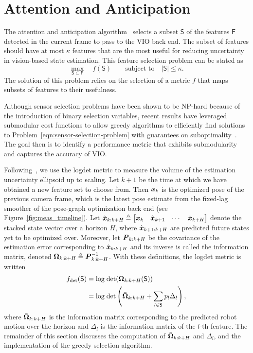 
\section{Attention and Anticipation}\label{sec:anticipation}

The attention and anticipation algorithm~\cite{Carlone2017} selects a subset $\mathsf{S}$ of the features $\mathsf{F}$ detected in the current frame to pass to the VIO back end.
The subset of features should have at most $\kappa$ features that are the most useful for reducing uncertainty in vision-based state estimation.
This feature selection problem can be stated as
\begin{equation}\label{eqn:sensor-selection-problem}
\max_{\mathsf{S}\subset\mathsf{F}} \quad f(\mathsf{S}) \qquad \text{subject to}\quad |\mathsf{S}|\le\kappa.
\end{equation}
The solution of this problem relies on the selection of a metric $f$ that maps subsets of features to their usefulness.

Although sensor selection problems have been shown to be NP-hard because of the introduction of binary selection variables, recent results have leveraged submodular cost functions to allow greedy algorithms to efficiently find solutions to Problem~\eqref{eqn:sensor-selection-problem} with guarantees on suboptimality~\cite{Shamaiah2010}.
The goal then is to identify a performance metric that exhibits submodularity and captures the accuracy of VIO.

Following~\cite{Carlone2017}, we use the logdet metric to measure the volume of the estimation uncertainty ellipsoid up to scaling.
Let $k+1$ be the time at which we have obtained a new feature set to choose from.
Then $\boldsymbol x_k$ is the optimized pose of the previous camera frame, which is the latest pose estimate from the fixed-lag smoother of the pose-graph optimization back end (see Figure~\ref{fig:meas_timeline}).
Let $\hat{\boldsymbol x}_{k:k+H}\triangleq\begin{bmatrix}\boldsymbol x_k&\hat{\boldsymbol x}_{k+1}&\cdots&\hat{\boldsymbol x}_{k+H}\end{bmatrix}$ denote the stacked state vector over a horizon $H$, where $\hat{\boldsymbol x}_{k+1:k+H}$ are predicted future states yet to be optimized over.
Moreover, let ${\boldsymbol P}_{k:k+H}$ be the covariance of the estimation error corresponding to $\hat{\boldsymbol x}_{k:k+H}$ and its inverse is called the information matrix, denoted ${\boldsymbol \Omega}_{k:k+H}\triangleq{\boldsymbol P}_{k:k+H}^{-1}$.
With these definitions, the logdet metric is written
\begin{align}
f_\text{det}(\mathsf{S}) &= \text{log}\;\text{det}({\boldsymbol \Omega}_{k:k+H}(\mathsf{S}))\\
&= \text{log}\;\text{det}\left(\bar{\boldsymbol \Omega}_{k:k+H} + \sum_{l\in\mathsf{S}}p_l\Delta_l\right),
\end{align}
where $\bar{\boldsymbol \Omega}_{k:k+H}$ is the information matrix corresponding to the predicted robot motion over the horizon and $\Delta_l$ is the information matrix of the $l$-th feature.
The remainder of this section discusses the computation of $\bar{\boldsymbol \Omega}_{k:k+H}$ and $\Delta_l$, and the implementation of the greedy selection algorithm.


